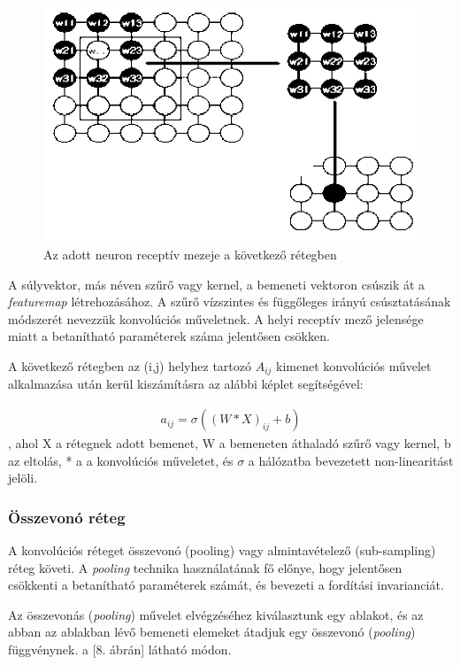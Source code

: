 \documentclass[12pt,a4]{article}
\begin{document}
	\begin{figure}[h]	
		\centering
		\includegraphics[width=0.7\linewidth]{receptiv}
		\caption{\cite{CNN} Az adott neuron receptív mezeje a következő rétegben}
	\end{figure}
		\newpage
	A súlyvektor, más néven szűrő vagy kernel, a bemeneti vektoron csúszik át a \textit{featuremap} létrehozásához.
	A szűrő vízszintes és függőleges irányú csúsztatásának módszerét nevezzük konvolúciós műveletnek. A helyi receptív mező jelensége miatt a betanítható paraméterek száma jelentősen csökken.
	
	A következő rétegben az (i,j) helyhez tartozó $A_{ij}$ kimenet konvolúciós
	művelet alkalmazása után kerül kiszámításra az alábbi képlet segítségével:
	\begin{mdframed}
	\begin{align}
		a_{ij} = \sigma((W * X)_{ij} + b)
	\end{align}
	, ahol X a rétegnek adott bemenet, W a bemeneten áthaladó szűrő vagy kernel,
	b az eltolás, * a 
	a konvolúciós műveletet, és $\sigma$ a hálózatba bevezetett non-linearitást jelöli.
	\end{mdframed}
	
	\subsubsection{Összevonó réteg}

	A konvolúciós réteget összevonó (pooling) vagy 
	almintavételező (sub-sampling) \cite{CNN} réteg követi.
	A \textit{pooling} technika használatának fő előnye, hogy 
	jelentősen csökkenti a betanítható paraméterek számát,
	és bevezeti a fordítási invarianciát. 
	
	
	Az összevonás (\textit{pooling}) művelet elvégzéséhez kiválasztunk egy ablakot,
	és az abban az ablakban lévő bemeneti elemeket átadjuk
	egy összevonó (\textit{pooling}) függvénynek. a [8. ábrán] látható módon.
	
\end{document}
